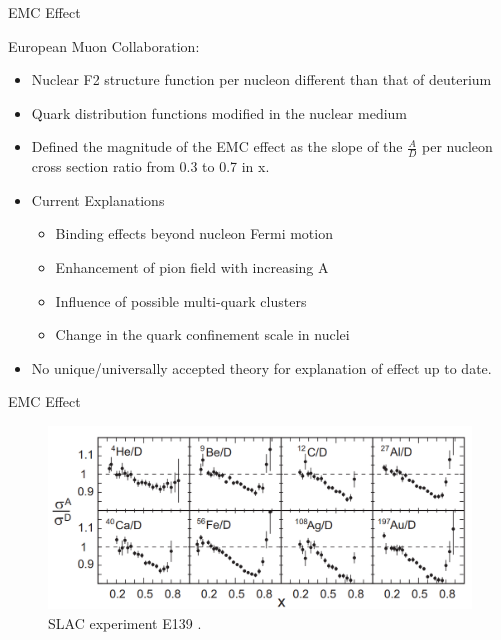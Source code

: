 \documentclass{beamer}
\begin{document}
\begin{frame}{EMC Effect}
	\vspace{-10pt}
	\begin{block}{}
		European Muon Collaboration:
		\begin{itemize}
			\item  Nuclear F2 structure function per nucleon different than that of deuterium
			\item Quark distribution functions modified in the nuclear medium
			\item Defined the magnitude of the EMC effect as the slope of the $\frac{A}{D}$ per nucleon cross section ratio from 0.3 to 0.7 in x.
			\item Current Explanations
			\begin{itemize}
				\item Binding effects beyond nucleon Fermi motion
				\item Enhancement of pion field with increasing A
				\item Influence of possible multi-quark clusters
				\item Change in the quark confinement scale in nuclei
			\end{itemize}
			\item No unique/universally accepted theory for explanation of effect up to date. 
		\end{itemize}
	\end{block}
\end{frame}

\begin{frame}{EMC Effect}

	\begin{figure}
		\caption{\label{EMC_slac} SLAC experiment E139 \cite{slac_emc}.}
		\includegraphics[width =12cm]{../images/EMC_slac_horiz.png}
	\end{figure}
	

\end{frame}
\end{document}
